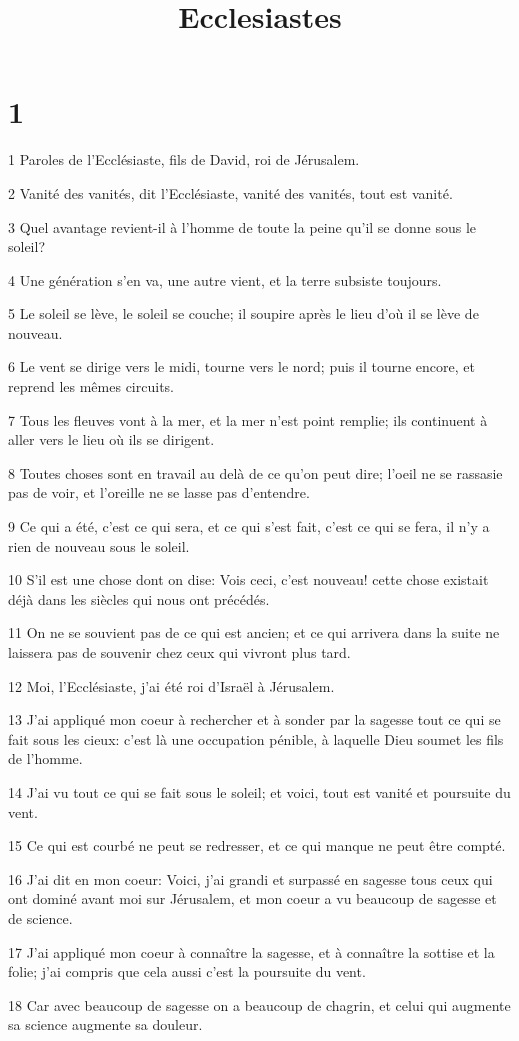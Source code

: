 

\title{Ecclesiastes}


\chapter{1}

\par 1 Paroles de l'Ecclésiaste, fils de David, roi de Jérusalem.
\par 2 Vanité des vanités, dit l'Ecclésiaste, vanité des vanités, tout est vanité.
\par 3 Quel avantage revient-il à l'homme de toute la peine qu'il se donne sous le soleil?
\par 4 Une génération s'en va, une autre vient, et la terre subsiste toujours.
\par 5 Le soleil se lève, le soleil se couche; il soupire après le lieu d'où il se lève de nouveau.
\par 6 Le vent se dirige vers le midi, tourne vers le nord; puis il tourne encore, et reprend les mêmes circuits.
\par 7 Tous les fleuves vont à la mer, et la mer n'est point remplie; ils continuent à aller vers le lieu où ils se dirigent.
\par 8 Toutes choses sont en travail au delà de ce qu'on peut dire; l'oeil ne se rassasie pas de voir, et l'oreille ne se lasse pas d'entendre.
\par 9 Ce qui a été, c'est ce qui sera, et ce qui s'est fait, c'est ce qui se fera, il n'y a rien de nouveau sous le soleil.
\par 10 S'il est une chose dont on dise: Vois ceci, c'est nouveau! cette chose existait déjà dans les siècles qui nous ont précédés.
\par 11 On ne se souvient pas de ce qui est ancien; et ce qui arrivera dans la suite ne laissera pas de souvenir chez ceux qui vivront plus tard.
\par 12 Moi, l'Ecclésiaste, j'ai été roi d'Israël à Jérusalem.
\par 13 J'ai appliqué mon coeur à rechercher et à sonder par la sagesse tout ce qui se fait sous les cieux: c'est là une occupation pénible, à laquelle Dieu soumet les fils de l'homme.
\par 14 J'ai vu tout ce qui se fait sous le soleil; et voici, tout est vanité et poursuite du vent.
\par 15 Ce qui est courbé ne peut se redresser, et ce qui manque ne peut être compté.
\par 16 J'ai dit en mon coeur: Voici, j'ai grandi et surpassé en sagesse tous ceux qui ont dominé avant moi sur Jérusalem, et mon coeur a vu beaucoup de sagesse et de science.
\par 17 J'ai appliqué mon coeur à connaître la sagesse, et à connaître la sottise et la folie; j'ai compris que cela aussi c'est la poursuite du vent.
\par 18 Car avec beaucoup de sagesse on a beaucoup de chagrin, et celui qui augmente sa science augmente sa douleur.


